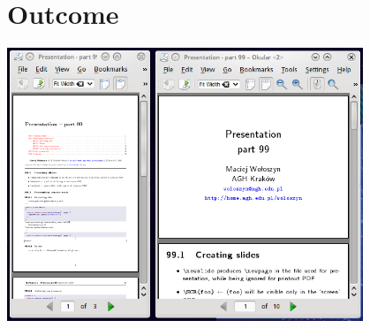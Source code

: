\newslide
\section{Outcome}
\begin{center}
\includegraphics[width=0.8\textwidth]{fig/final}
\end{center}

